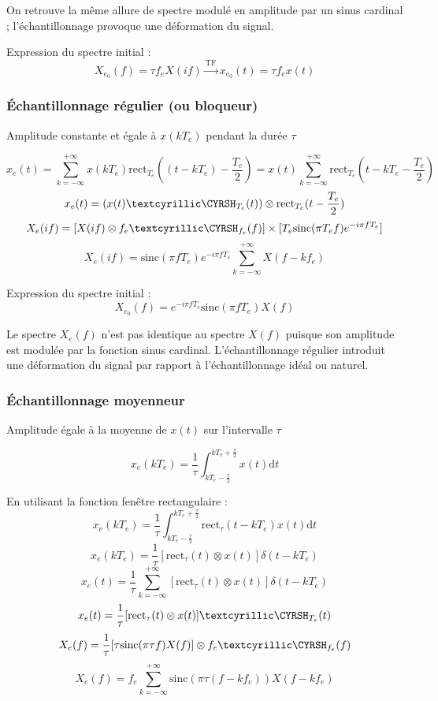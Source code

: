 \documentclass[a4paper,12pt]{report}
\begin{document}
On retrouve la même allure de spectre modulé en amplitude par un sinus cardinal ; l'échantillonnage provoque une déformation du signal.

Expression du spectre initial :
\[ X_{e_0}(f) = \tau f_e X(if) \xrightarrow{\mathrm{TF}^{}} x_{e_0}(t) = \tau f_e x(t) \]

\subsubsection{Échantillonnage régulier (ou bloqueur)}

Amplitude constante et égale à $x(kT_e)$ pendant la durée $\tau$

\[ x_e(t) = \sum_{k=-\infty}^{+\infty} x(kT_e) \mathrm{rect}_{T_e}((t-kT_e)-\dfrac{T_e}{2}) = x(t) \sum_{k=-\infty}^{+\infty} \mathrm{rect}_{T_e}(t-kT_e-\dfrac{T_e}{2}) \]
\[ x_e(t) = (x(t) \dirac_{T_e}(t)) \otimes \mathrm{rect}_{T_e}(t-\dfrac{T_e}{2}) \]
\[ X_e(if) = [X(if) \otimes f_e \dirac_{f_e}(f)] \times [T_e \mathrm{sinc}(\pi T_e f) e^{-i\pi fT_e}] \]
\[ X_e(if) = \mathrm{sinc}(\pi fT_e) e^{-i\pi fT_e} \sum_{k=-\infty}^{+\infty} X(f-kf_e) \]

Expression du spectre initial :
\[ X_{e_0}(f) = e^{-i\pi fT_e} \mathrm{sinc}(\pi fT_e) X(f) \]

Le spectre $X_e(f)$ n'est pas identique au spectre $X(f)$ puisque son amplitude est modulée par la fonction sinus cardinal. L'échantillonnage régulier introduit une déformation du signal par rapport à l'échantillonnage idéal ou naturel.

\subsubsection{Échantillonnage moyenneur}

Amplitude égale à la moyenne de $x(t)$ sur l'intervalle $\tau$

\[ x_e(kT_e) = \dfrac{1}{\tau} \int_{kT_e - \frac{\tau}{2}}^{kT_e + \frac{\tau}{2}} x(t) \mathrm{d}t \]

En utilisant la fonction fenêtre rectangulaire :
\[ x_e(kT_e) = \dfrac{1}{\tau} \int_{kT_e - \frac{\tau}{2}}^{kT_e + \frac{\tau}{2}} \mathrm{rect}_\tau(t-kT_e) x(t) \mathrm{d}t \]
\[ x_e(kT_e) = \dfrac{1}{\tau} [\mathrm{rect}_\tau(t) \otimes x(t)] \delta(t-kT_e) \]
\[ x_e(t) = \dfrac{1}{\tau} \sum_{k = -\infty}^{+\infty} [\mathrm{rect}_\tau (t) \otimes x(t)] \delta(t-kT_e) \]
\[ x_e(t) = \dfrac{1}{\tau} [\mathrm{rect}_\tau (t) \otimes x(t)] \dirac_{T_e}(t) \]
\[ X_e(f) = \dfrac{1}{\tau} [\tau \mathrm{sinc}(\pi \tau f) X(f)] \otimes f_e \dirac_{f_e}(f) \]
\[ X_e(f) = f_e \sum_{k=-\infty}^{+\infty} \mathrm{sinc}(\pi \tau (f-kf_e)) X(f-kf_e) \]
\end{document}
